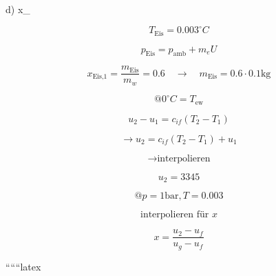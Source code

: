 d) \quad x_{}

\[
T_{\text{Eis}} = 0.003^\circ C
\]

\[
p_{\text{Eis}} = p_{\text{amb}} + m_e U
\]

\[
x_{\text{Eis,1}} = \frac{m_{\text{Eis}}}{m_w} = 0.6 \quad \longrightarrow \quad m_{\text{Eis}} = 0.6 \cdot 0.1 \text{kg}
\]

\[
@ 0^\circ C = T_{\text{ew}}
\]

\[
u_2 - u_1 = c_{if} (T_2 - T_1)
\]

\[
\longrightarrow u_2 = c_{if} (T_2 - T_1) + u_1
\]

\[
\longrightarrow \text{interpolieren}
\]

\[
u_2 = 3345
\]

\[
@ p = 1 \text{bar}, T = 0.003
\]

\[
\text{interpolieren für } x
\]

\[
x = \frac{u_2 - u_f}{u_g - u_f}
\]

``````latex
